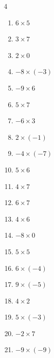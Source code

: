\begin{multicols}{4}
\begin{enumerate}
  \item $6\times 5$
        \phantom{$=30$}

  \item $3\times 7$
        \phantom{$=21$}

  \item $2\times 0$
        \phantom{$=0$}

  \item $-8\times (-3)$
        \phantom{$=24$}

  \item $-9\times 6$
        \phantom{$=-54$}

  \item $5\times 7$
        \phantom{$=35$}

  \item $-6\times 3$
        \phantom{$=-18$}

  \item $2\times (-1)$
        \phantom{$=-2$}

  \item $-4\times (-7)$
        \phantom{$=28$}

  \item $5\times 6$
        \phantom{$=30$}

  \item $4\times 7$
        \phantom{$=28$}

  \item $6\times 7$
        \phantom{$=42$}

  \item $4\times 6$
        \phantom{$=24$}

\columnbreak %

  \item $-8\times 0$
        \phantom{$=0$}

  \item $5\times 5$
        \phantom{$=25$}

  \item $6\times (-4)$
        \phantom{$=-24$}

  \item $9\times (-5)$
        \phantom{$=-45$}

  \item $4\times 2$
        \phantom{$=8$}

  \item $5\times (-3)$
        \phantom{$=-15$}

  \item $-2\times 7$
        \phantom{$=-14$}

  \item $-9\times (-9)$
        \phantom{$=81$}


\end{enumerate}
\end{multicols}
